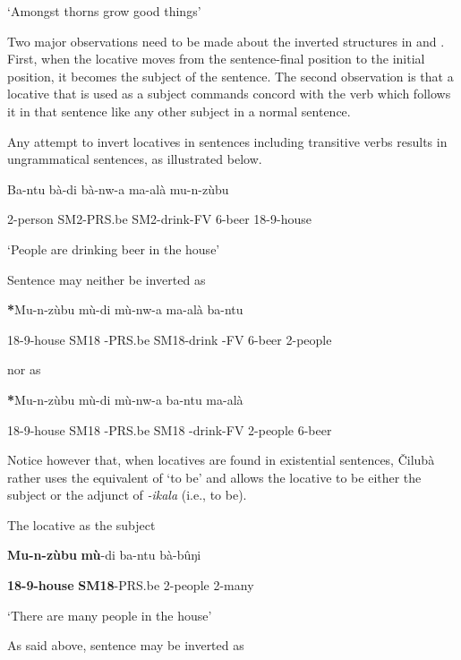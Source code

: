 \documentclass[output=paper]{langscibook}
\begin{document}
\glt ‘Amongst thorns grow good things’

Two major observations need to be made about the inverted structures in  and . First, when the locative moves from the sentence-final position to the initial position, it becomes the subject of the sentence. The second observation is that a locative that is used as a subject commands concord with the verb which follows it in that sentence like any other subject in a normal sentence.

Any attempt to invert locatives in sentences including transitive verbs results in ungrammatical sentences, as illustrated below.

\ea%
    \label{ex:lukusa:79}
    \z

          Ba-ntu    bà-di        bà-nw-a      ma-alà  mu-n-zùbu

2-person  SM2-PRS.be  SM2-drink-FV  6-beer  18-9-house

\glt ‘People are drinking beer in the house’

Sentence  may neither be inverted as

\ea%
    \label{ex:lukusa:80}
    \z

           \textbf{*}Mu-n-zùbu  mù-di      mù-nw-a      ma-alà  ba-ntu

  18-9-house  SM18  {}-PRS.be  SM18-drink  {}-FV  6-beer  2-people

nor as

\ea%
    \label{ex:lukusa:81}
    \z

           \textbf{*}Mu-n-zùbu  mù-di        mù-nw-a       ba-ntu    ma-alà

  18-9-house  SM18  {}-PRS.be    SM18  {}-drink-FV  2-people  6-beer

Notice however that, when locatives are found in existential sentences, Čilubà rather uses the equivalent of ‘to be’ and allows the locative to be either the subject or the adjunct of \textit{{}-ikala} (i.e., to be).

\ea%
    \label{ex:lukusa:82}
    \z

           The locative as the subject

\textbf{Mu-n-zùbu}     \textbf{mù}{}-di        ba-ntu    bà-bûŋi

\textbf{18-9-house}      \textbf{SM18}{}-PRS.be    2-people  2-many

\glt ‘There are many people in the house’

As said above, sentence  may be inverted as
\end{document}
